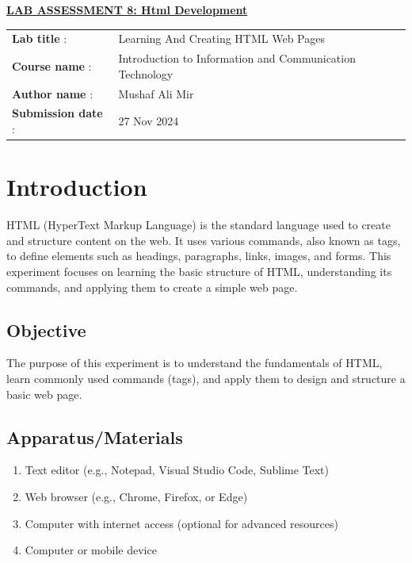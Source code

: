 \documentclass[a4paper,9pt]{article}
\begin{document}
\begin{center}
	{\Huge \bfseries \underline{ LAB ASSESSMENT 8: Html Development } \par}
\end{center}
\noindent\begin{tabular}{@{}ll}
	\textbf{Lab title} :&Learning And Creating HTML Web Pages \\
	\textbf{Course name} :&  Introduction to Information and Communication Technology\\
	\textbf{Author name} : & Mushaf Ali Mir\\
	\textbf{Submission date} :& 27 Nov 2024 \\
\end{tabular}

\section*{Introduction}
\setcounter{section}{8}
\setcounter{figure}{0}  %
\setcounter{subsection}{0}

HTML (HyperText Markup Language) is the standard language used to create and structure content on the web. It uses various commands, also known as tags, to define elements such as headings, paragraphs, links, images, and forms. This experiment focuses on learning the basic structure of HTML, understanding its commands, and applying them to create a simple web page.

\subsection{Objective}
The purpose of this experiment is to understand the fundamentals of HTML, learn commonly used commands (tags), and apply them to design and structure a basic web page.

\subsection{Apparatus/Materials}
\begin{enumerate}
	\item Text editor (e.g., Notepad, Visual Studio Code, Sublime Text)
	\item Web browser (e.g., Chrome, Firefox, or Edge)
	\item Computer with internet access (optional for advanced resources)
	\item Computer or mobile device
	
\end{enumerate}
\end{document}
